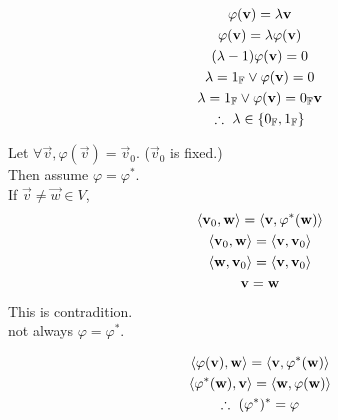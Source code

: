 \documentclass{mathtoolkit}
\begin{document}
\begin{p}
  \item
    \begin{subp}
      \item
        \begin{gather*}
          \varphi(\vec{v}) = \lambda \vec{v} \\
          \varphi(\vec{v}) = \lambda \varphi(\vec{v}) \\
          (\lambda - 1) \varphi(\vec{v}) = 0 \\
          \lambda = 1_\field{F} \vee \varphi(\vec{v}) = 0 \\
          \lambda = 1_\field{F} \vee \varphi(\vec{v}) = 0_\field{F} \vec{v} \\
          \therefore \lambda \in \left\{ 0_\field{F}, 1_\field{F} \right\}
        \end{gather*}

      \item
        Let $\forall \vec{v}, \varphi(\vec{v}) = \vec{v}_0$.
        ($\vec{v}_0$ is fixed.) \\
        Then assume $\varphi = \varphi^*$. \\
        If $\vec{v} \ne \vec{w} \in V$,
        \begin{gather*}
          \langle \mathbf{v}_0, \mathbf{w} \rangle = \langle \mathbf{v}, \varphi^*(\mathbf{w}) \rangle \\
          \langle \mathbf{v}_0, \mathbf{w} \rangle = \langle \mathbf{v}, \mathbf{v}_0 \rangle \\
          \langle \mathbf{w}, \mathbf{v}_0 \rangle = \langle \mathbf{v}, \mathbf{v}_0 \rangle \\
          \mathbf{v} = \mathbf{w}
        \end{gather*}
        This is contradition. \\
        \therefore not always $\varphi = \varphi^*$.
    \end{subp}

  \item
    \begin{subp}
      \item
        \begin{gather*}
          \ip{\varphi(\vec{v})}{\vec{w}} = \ip{\vec{v}}{\varphi^*(\vec{w})} \\
          \ip{\varphi^*(\vec{w})}{\vec{v}} = \ip{\vec{w}}{\varphi(\vec{w})} \\
          \therefore (\varphi^*)^* = \varphi
        \end{gather*}


\end{subp}
\end{p}
\end{document}
